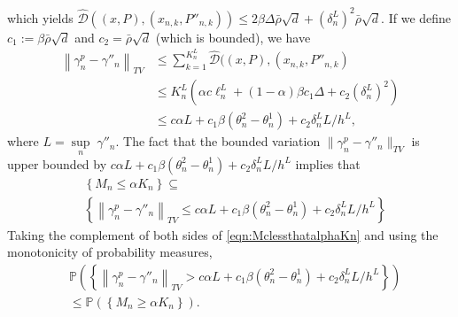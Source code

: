 \documentclass[Afour,sageh,times]{sagej}
\begin{document}
which yields $\hat{\mathcal{D}}((x,P), (x_{n,k},P''_{n,k})) \leq 2\beta\Delta \bar{\rho} \sqrt{d}+(\delta^L_n)^2\bar{\rho} \sqrt{d}$. If we define $c_1:=\beta \bar{\rho} \sqrt{d}$ and $c_2=\bar{\rho} \sqrt{d}$ (which is bounded), we have
\begin{align}
\left\|\gamma^p_{n}-\gamma''_{n}\right\|_{TV}& \leq  \sum_{k=1}^{K^L_n}  \hat{\mathcal{D}}((x,P), (x_{n,k},P''_{n,k})\nonumber\\
&\leq K^L_n (\alpha c \ell^L_n + (1-\alpha) \beta c_1 \Delta+c_2(\delta^L_n)^2) \nonumber\\
&\leq c\alpha L+c_1\beta (\theta^2_n-\theta^1_n)+c_2\delta^L_nL/h^L,
\end{align}
where $L=\underset{n}{\sup}\;\gamma''_n$. The fact that the bounded variation $\|\gamma^p_n-\gamma''_n\|_{TV}$ is upper bounded by $c\alpha L+c_1\beta (\theta^2_n-\theta^1_n)+c_2\delta^L_nL/h^L$ implies that
\begin{align}
&\left\{M_{n} \leq \alpha K_{n}\right\} \subseteq\nonumber\\
&\left\{\left\|\gamma^p_{n}-\gamma''_{n}\right\|_{TV} \leq c\alpha L+c_1\beta (\theta^2_n-\theta^1_n)+c_2\delta^L_nL/h^L\right\}\label{eqn:MclessthatalphaKn}
\end{align}
Taking the complement of both sides of \eqref{eqn:MclessthatalphaKn} and using the monotonicity of probability measures,
\begin{align}
&\mathbb{P}\left(\left\{\left\|\gamma^p_{n}-\gamma''_{n}\right\|_{TV}>c\alpha L+c_1\beta (\theta^2_n-\theta^1_n)+c_2\delta^L_nL/h^L\right\}\right)\nonumber\\
&\leq \mathbb{P}\left(\left\{M_{n} \geq \alpha K_{n}\right\}\right).
\label{eq:complement}
\end{align}
\end{document}
